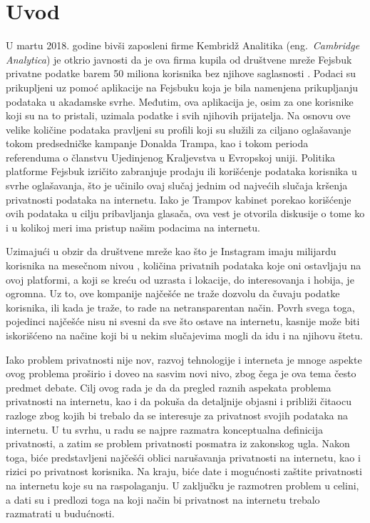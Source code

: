 \documentclass[a4paper]{article}
\begin{document}
\section{Uvod}
\label{sec:uvod}  
\par U martu 2018. godine bivši zaposleni firme Kembridž Analitika (eng.~{\em Cambridge Analytica}) je otkrio javnosti da je ova firma kupila od društvene mreže Fejsbuk privatne podatke barem 50 miliona korisnika bez njihove saglasnosti \cite{guardian}. Podaci su prikupljeni uz pomoć aplikacije na Fejsbuku koja je bila namenjena prikupljanju podataka u akadamske svrhe. Međutim, ova aplikacija je, osim za one korisnike koji su na to pristali, uzimala podatke i svih njihovih prijatelja. Na osnovu ove velike količine podataka pravljeni su profili koji su služili za ciljano oglašavanje tokom predsedničke kampanje Donalda Trampa, kao i tokom perioda referenduma o članstvu Ujedinjenog Kraljevstva u Evropskoj uniji. Politika platforme Fejsbuk izričito zabranjuje prodaju ili korišćenje podataka korisnika u svrhe oglašavanja, što je učinilo ovaj slučaj jednim od najvećih slučaja kršenja privatnosti podataka na internetu. Iako je Trampov kabinet porekao korišćenje ovih podataka u cilju pribavljanja glasača, ova vest je otvorila diskusije o tome ko i u kolikoj meri ima pristup našim podacima na internetu.
\par Uzimajući u obzir da društvene mreže kao što je Instagram imaju milijardu korisnika na mesečnom nivou \cite{instagram}, količina privatnih podataka koje oni ostavljaju na ovoj platformi, a koji se kreću od uzrasta i lokacije, do interesovanja i hobija, je ogromna. Uz to, ove kompanije najčešće ne traže dozvolu da čuvaju podatke korisnika, ili kada je traže, to rade na netransparentan način. Povrh svega toga, pojedinci najčešće nisu ni svesni da sve što ostave na internetu, kasnije može biti iskorišćeno na načine koji bi u nekim slučajevima mogli da idu i na njihovu štetu.
\par Iako problem privatnosti nije nov, razvoj tehnologije i interneta je mnoge aspekte ovog problema proširio i doveo na sasvim novi nivo, zbog čega je ova tema često predmet debate. Cilj ovog rada je da da pregled raznih aspekata problema privatnosti na internetu, kao i da pokuša da detaljnije objasni i približi čitaocu razloge zbog kojih bi trebalo da se interesuje za privatnost svojih podataka na internetu. U tu svrhu, u radu se najpre razmatra konceptualna definicija privatnosti, a zatim se problem privatnosti posmatra iz zakonskog ugla. Nakon toga, biće predstavljeni najčešći oblici narušavanja privatnosti na internetu, kao i rizici po privatnost korisnika. Na kraju, biće date i mogućnosti zaštite privatnosti na internetu koje su na raspolaganju. U zaključku je razmotren problem u celini, a dati su i predlozi toga na koji način bi privatnost na internetu trebalo razmatrati u budućnosti.
\end{document}
